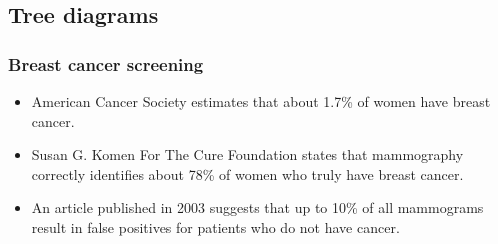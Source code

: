 
\subsection{Tree diagrams}



\begin{frame}
\frametitle{Breast cancer screening}

\begin{itemize}

\item American Cancer Society estimates that about 1.7\% of women have breast cancer. \\
{\small{}}

\item Susan G. Komen For The Cure Foundation states that mammography correctly identifies about 78\% of women who truly have breast cancer. \\
{\small{}}

\item An article published in 2003 suggests that up to 10\% of all mammograms result in false positives for patients who do not have cancer. \\{\small {}}

\end{itemize}

\vfill


\end{frame}


